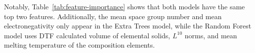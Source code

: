 \documentclass[twocolumn, nofootinbib, secnumarabic, amssymb, nobibnotes, aps, prd]{revtex4-2}
\begin{document}
Notably, Table~\ref{tab:feature-importance} shows that both models have the same top two features. Additionally, the mean space group number and mean electronegativity only appear in the Extra Trees model, while the Random Forest model uses DTF calculated volume of elemental solids, $L^{10}$ norms, and mean melting temperature of the composition elements.

\end{document}

